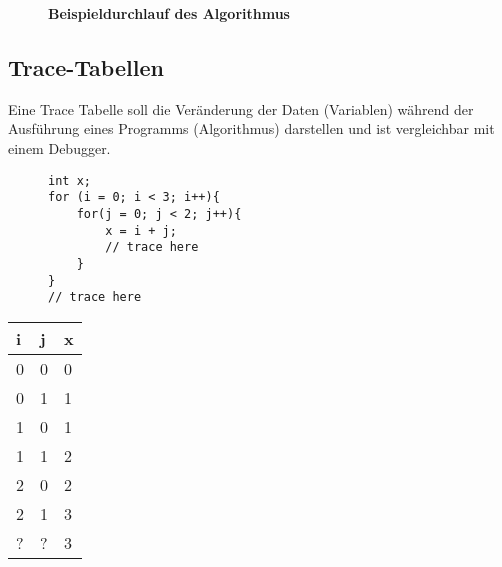 \begin{figure}[H]
{
    }
    \caption{\textbf{Beispieldurchlauf des Algorithmus}}
\end{figure}

\clearpage

\subsection{Trace-Tabellen}

Eine Trace Tabelle soll die Veränderung der Daten (Variablen)
während der Ausführung eines Programms (Algorithmus) darstellen
und ist vergleichbar mit einem Debugger.

\begin{figure}[H]
\begin{lstlisting}
int x;
for (i = 0; i < 3; i++){
    for(j = 0; j < 2; j++){
        x = i + j; 
        // trace here
    }
}
// trace here
\end{lstlisting}
\end{figure}

\begin{table}[H]
    \begin{tabular}{|l|l|l|}
    \hline
        i & j & x \\ \hline
        0 & 0 & 0 \\ \hline
        0 & 1 & 1 \\ \hline
        1 & 0 & 1 \\ \hline
        1 & 1 & 2 \\ \hline
        2 & 0 & 2 \\ \hline
        2 & 1 & 3 \\ \hline
        ? & ? & 3 \\ \hline
    \end{tabular}
\end{table}
